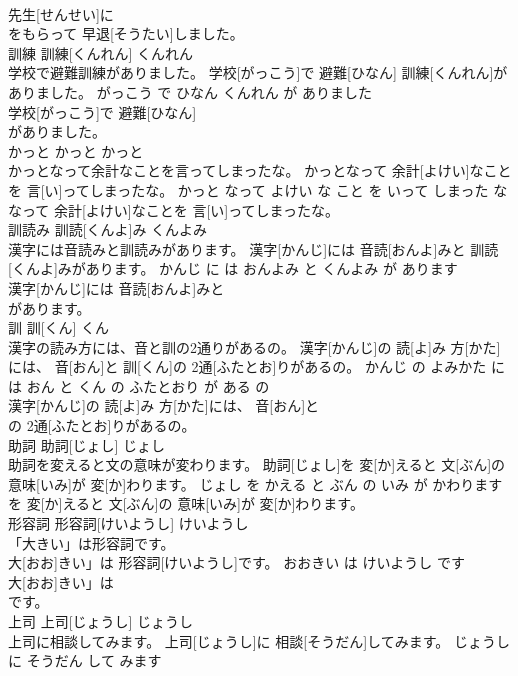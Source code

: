 \documentclass[8pt]{extreport}
\begin{document}
\begin{CJK}{UTF8}{min}
\\	先生[せんせい]に
\\	をもらって 早退[そうたい]しました。			
\\	訓練	訓練[くんれん]	くんれん	
\\	学校で避難訓練がありました。	学校[がっこう]で 避難[ひなん] 訓練[くんれん]がありました。	がっこう で ひなん くんれん が ありました	
\\	学校[がっこう]で 避難[ひなん]
\\	がありました。			
\\	かっと	かっと	かっと	
\\	かっとなって余計なことを言ってしまったな。	かっとなって 余計[よけい]なことを 言[い]ってしまったな。	かっと なって よけい な こと を いって しまった な	
\\	なって 余計[よけい]なことを 言[い]ってしまったな。			
\\	訓読み	訓読[くんよ]み	くんよみ	
\\	漢字には音読みと訓読みがあります。	漢字[かんじ]には 音読[おんよ]みと 訓読[くんよ]みがあります。	かんじ に は おんよみ と くんよみ が あります	
\\	漢字[かんじ]には 音読[おんよ]みと
\\	があります。			
\\	訓	訓[くん]	くん	
\\	漢字の読み方には、音と訓の2通りがあるの。	漢字[かんじ]の 読[よ]み 方[かた]には、 音[おん]と 訓[くん]の 2通[ふたとお]りがあるの。	かんじ の よみかた に は おん と くん の ふたとおり が ある の	
\\	漢字[かんじ]の 読[よ]み 方[かた]には、 音[おん]と
\\	の 2通[ふたとお]りがあるの。			
\\	助詞	助詞[じょし]	じょし	
\\	助詞を変えると文の意味が変わります。	助詞[じょし]を 変[か]えると 文[ぶん]の 意味[いみ]が 変[か]わります。	じょし を かえる と ぶん の いみ が かわります	
\\	を 変[か]えると 文[ぶん]の 意味[いみ]が 変[か]わります。			
\\	形容詞	形容詞[けいようし]	けいようし	
\\	「大きい」は形容詞です。	
\\	大[おお]きい」は 形容詞[けいようし]です。	おおきい は けいようし です	
\\	大[おお]きい」は
\\	です。			
\\	上司	上司[じょうし]	じょうし	
\\	上司に相談してみます。	上司[じょうし]に 相談[そうだん]してみます。	じょうし に そうだん して みます	

\end{CJK}
\end{document}
